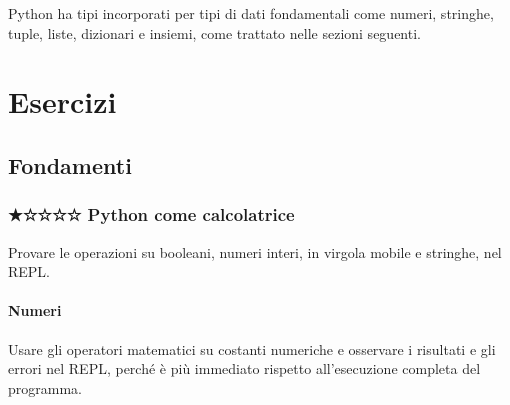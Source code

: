 \documentclass[
  letterpaper,
]{scrbook}
\begin{document}
Python ha tipi incorporati per tipi di dati fondamentali come numeri,
stringhe, tuple, liste, dizionari e insiemi, come trattato nelle sezioni
seguenti.

\chapter{Esercizi}\label{esercizi}

\section{Fondamenti}\label{fondamenti}

\subsection{★☆☆☆☆ Python come
calcolatrice}\label{python-come-calcolatrice}

Provare le operazioni su booleani, numeri interi, in virgola mobile e
stringhe, nel REPL.

\subsubsection{Numeri}\label{numeri}

\begin{tcolorbox}[enhanced jigsaw, leftrule=.75mm, arc=.35mm, opacityback=0, rightrule=.15mm, titlerule=0mm, colbacktitle=quarto-callout-tip-color!10!white, colback=white, colframe=quarto-callout-tip-color-frame, bottomrule=.15mm, toprule=.15mm, bottomtitle=1mm, toptitle=1mm, title=\textcolor{quarto-callout-tip-color}{\faLightbulb}\hspace{0.5em}{Suggerimento}, breakable, coltitle=black, opacitybacktitle=0.6, left=2mm]

Usare gli operatori matematici su costanti numeriche e osservare i
risultati e gli errori nel REPL, perché è più immediato rispetto
all'esecuzione completa del programma.

\end{tcolorbox}
\end{document}
